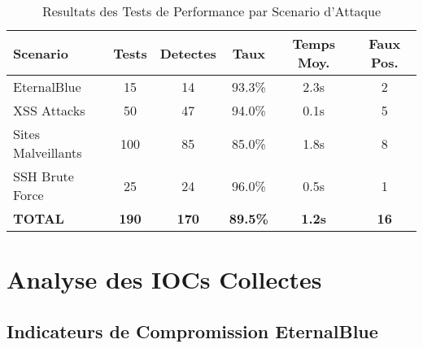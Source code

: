 \begin{table}[H]
    \centering
    \caption{Resultats des Tests de Performance par Scenario d'Attaque}
    \begin{tabular}{|l|c|c|c|c|c|}
        \hline
        \textbf{Scenario}  & \textbf{Tests} & \textbf{Detectes} & \textbf{Taux}   & \textbf{Temps Moy.} & \textbf{Faux Pos.} \\
        \hline
        EternalBlue        & 15             & 14                & 93.3\%          & 2.3s                & 2                  \\
        \hline
        XSS Attacks        & 50             & 47                & 94.0\%          & 0.1s                & 5                  \\
        \hline
        Sites Malveillants & 100            & 85                & 85.0\%          & 1.8s                & 8                  \\
        \hline
        SSH Brute Force    & 25             & 24                & 96.0\%          & 0.5s                & 1                  \\
        \hline
        \textbf{TOTAL}     & \textbf{190}   & \textbf{170}      & \textbf{89.5\%} & \textbf{1.2s}       & \textbf{16}        \\
        \hline
    \end{tabular}
\end{table}

\section{Analyse des IOCs Collectes}

\subsection{Indicateurs de Compromission EternalBlue}

